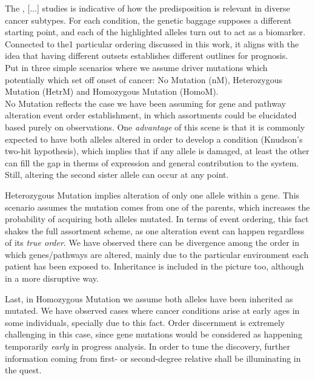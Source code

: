 The \cite{DeLaChapelle2004GeneticCancer}, [...] studies is indicative of how the predisposition is relevant in diverse cancer subtypes. For each condition, the genetic baggage supposes a different starting point, and each of the highlighted alleles turn out to act as a biomarker. Connected to the1 particular ordering discussed in this work, it aligns with the idea that having different outsets establishes different outlines for prognosis.
\\

Put in three simple scenarios where we assume driver mutations which potentially which set off onset of cancer: No Mutation (nM), Heterozygous Mutation (HetrM) and Homozygous Mutation (HomoM). 
\\

No Mutation reflects the case we have been assuming for gene and pathway alteration event order establishment, in which assortments could be elucidated based purely on observations. One \emph{advantage} of this scene is that it is commonly expected to have both alleles altered in order to develop a condition (Knudson’s two-hit hypothesis), which implies that if any allele is damaged, at least the other can fill the gap in therms of expression and general contribution to the system. Still, altering the second sister allele can occur at any point.

Heterozygous Mutation implies alteration of only one allele within a gene. This scenario assumes the mutation comes from one of the parents, which increases the probability of acquiring both alleles mutated. In terms of event ordering, this fact shakes the full assortment scheme, as one alteration event can happen regardless of its \emph{true order}. We have observed there can be divergence among the order in which genes/pathways are altered, mainly due to the particular environment each patient has been exposed to. Inheritance is included in the picture too, although in a more disruptive way.

Last, in Homozygous Mutation we assume both alleles have been inherited as mutated. We have observed cases where cancer conditions arise at early ages in some individuals, specially due to this fact. Order discernment is extremely challenging in this case, since gene mutations would be considered as happening temporarily \emph{early} in progress analysis. 
In order to tune the discovery, further information coming from first- or second-degree relative shall be illuminating in the quest.
\\

